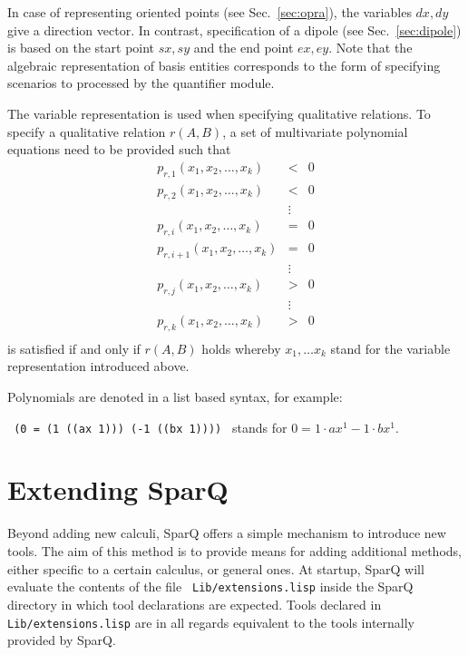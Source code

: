 \documentclass[headsepline]{scrreprt}
\theoremstyle{definition}
\newcommand{\engine}{SparQ}
\begin{document}
In case of representing oriented points (see Sec.~\ref{sec:opra}), the variables $dx,dy$ 
give a direction vector. In contrast, specification of a dipole (see Sec.~\ref{sec:dipole})  is based
on the start point $sx,sy$ and the end point $ex,ey$. Note that the algebraic representation of basis entities corresponds to the form of specifying scenarios to processed by the quantifier module.


The variable representation is used when specifying qualitative relations. 
To specify a qualitative relation $r(A,B)$, a set of multivariate polynomial equations need to be provided such that
\begin{eqnarray*}
	p_{r,1}(x_1, x_2, \ldots, x_k) &<& 0\\
	p_{r,2}(x_1, x_2, \ldots, x_k) &<& 0\\
		&\vdots&\\
	p_{r,i}(x_1, x_2, \ldots, x_k) &=& 0\\
	p_{r,i+1}(x_1, x_2, \ldots, x_k) &=& 0\\
		&\vdots&\\
	p_{r,j}(x_1, x_2, \ldots, x_k) &>& 0\\
		&\vdots&\\
	p_{r,k}(x_1, x_2, \ldots, x_k) &>& 0\\
\end{eqnarray*}
is satisfied if and only if $r(A,B)$ holds whereby $x_1, \ldots x_k$ stand for the variable representation introduced above.

Polynomials are denoted in a list based syntax, for example:

\texttt{ (0 = (1 ((ax 1))) (-1 ((bx 1)))) } stands for $0 = 1\cdot ax^1 - 1\cdot bx^1$. 

\section{Extending \engine{}}\label{sec:extending}
Beyond adding new calculi, \engine{} offers a simple mechanism to introduce new tools. The aim of this method is to provide means for adding additional methods, either specific to a certain calculus, or general ones. 
At startup, \engine{} will evaluate the contents of the file \texttt{ Lib/extensions.lisp} inside the \engine{} directory in which tool declarations are expected. Tools declared in \texttt{ Lib/extensions.lisp} are in all regards equivalent to the tools internally provided by \engine{}.
\end{document}
